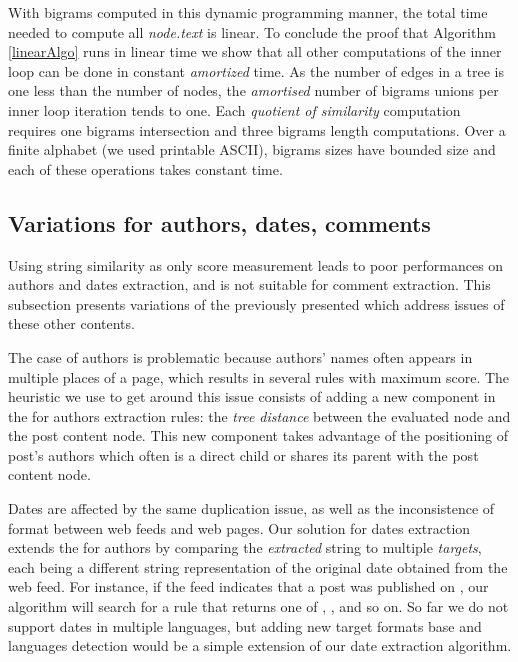 \linearAlgo

With bigrams computed in this dynamic programming manner, the total time needed to compute all \code{(}\emph{node.text}\code{)} is linear. To conclude the proof that Algorithm \ref{linearAlgo} runs in linear time we show that all other computations of the inner loop can be done in constant \emph{amortized} time. As the number of edges in a tree is one less than the number of nodes, the \emph{amortised} number of bigrams unions per inner loop iteration tends to one. Each \emph{quotient of similarity} computation requires one bigrams intersection and three bigrams length computations. Over a finite alphabet (we used printable ASCII), bigrams sizes have bounded size and each of these operations takes constant time.


\subsection{Variations for authors, dates, comments}
\label{variationsforauthorsdatesandcomments}

Using string similarity as only score measurement leads to poor performances on authors and dates extraction, and is not suitable for comment extraction. This subsection presents variations of the previously presented  which address issues of these other contents.

The case of authors is problematic because authors' names often appears in multiple places of a page, which results in several rules with maximum  score. The heuristic we use to get around this issue consists of adding a new component in the  for authors extraction rules: the \emph{tree distance} between the evaluated node and the post content node. This new component takes advantage of the positioning of post's authors which often is a direct child or shares its parent with the post content node.

Dates are affected by the same duplication issue, as well as the inconsistence of format between web feeds and web pages. Our solution for dates extraction extends the  for authors by comparing the \emph{extracted} string to multiple \emph{targets}, each being a different string representation of the original date obtained from the web feed. For instance, if the feed indicates that a post was published on , our algorithm will search for a rule that returns one of , ,  and so on. So far we do not support dates in multiple languages, but adding new target formats base and languages detection would be a simple extension of our date extraction algorithm.

